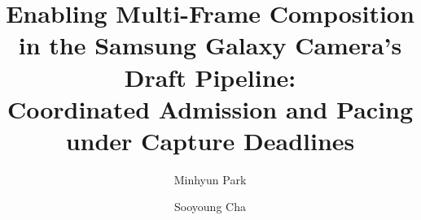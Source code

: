 \documentclass[sigconf,screen]{acmart}
\begin{document}


\title[Enabling Multi-Frame Composition in a Camera Draft Pipeline]
{Enabling Multi-Frame Composition \\
in the Samsung Galaxy Camera's Draft Pipeline: \\
Coordinated Admission and Pacing under Capture Deadlines}

\author{Minhyun Park}

\author{Sooyoung Cha}



\maketitle










\end{document}
